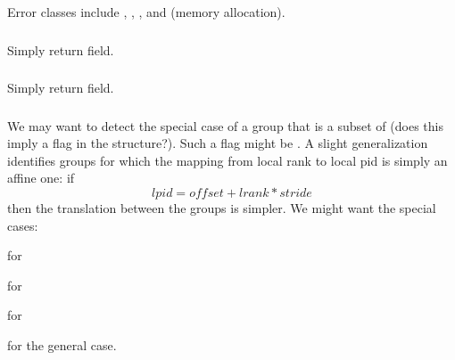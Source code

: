 \documentclass{article}
\begin{document}
Error classes include , , 
, and  (memory allocation). 

\subsubsection{}
Simply return  field.

\subsubsection{}
Simply return  field.

\subsubsection{}
We may want to detect the special case of a group that is a subset of
 (does this imply a flag in the 
structure?).  Such a flag might be
.  A slight generalization
identifies groups for which the mapping from local rank to local pid
is simply an affine one: if 
\[
   lpid = offset + lrank * stride
\]
then the translation between the groups is simpler.  We might want the 
special cases:
\begin{description}
\item{} for 
\item{} for 
\item{} for 
\item{} for the general case.
\end{description}
\end{document}
